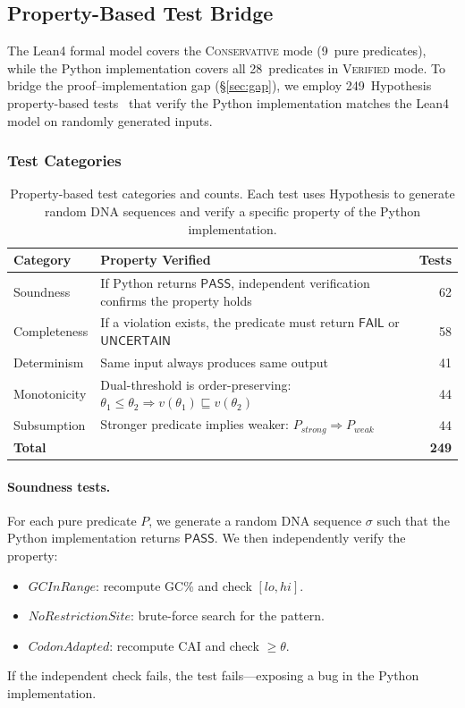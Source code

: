 \documentclass[sigplan,10pt,manuscript,review,anonymous]{acmart}
\newcommand{\PASS}{\ensuremath{\mathsf{PASS}}\xspace}
\newcommand{\FAIL}{\ensuremath{\mathsf{FAIL}}\xspace}
\newcommand{\UNCERTAIN}{\ensuremath{\mathsf{UNCERTAIN}}\xspace}
\newcommand{\seq}{\sigma}
\newcommand{\pred}{P}
\newcommand{\verdict}{v}
\newcommand{\CONSERVATIVE}{\textsc{Conservative}\xspace}
\newcommand{\VERIFIED}{\textsc{Verified}\xspace}
\begin{document}
\subsection{Property-Based Test Bridge}\label{sec:pbt}

The Lean4 formal model covers the \CONSERVATIVE{} mode (9~pure
predicates), while the Python implementation covers all 28~predicates
in \VERIFIED{} mode.
To bridge the proof--implementation gap (\S\ref{sec:gap}), we employ
249~Hypothesis property-based tests~\cite{maciver2019hypothesis}
that verify the Python implementation matches the Lean4 model on
randomly generated inputs.

\subsubsection{Test Categories}

\begin{table}[t]
\centering
\caption{Property-based test categories and counts. Each test uses
         Hypothesis to generate random DNA sequences and verify a
         specific property of the Python implementation.}
\label{tab:pbt}
\begin{tabular}{lp{6.5cm}r}
\toprule
\textbf{Category} & \textbf{Property Verified} & \textbf{Tests} \\
\midrule
Soundness &
  If Python returns \PASS{}, independent verification confirms
  the property holds & 62 \\
Completeness &
  If a violation exists, the predicate must return \FAIL{} or
  \UNCERTAIN{} & 58 \\
Determinism &
  Same input always produces same output & 41 \\
Monotonicity &
  Dual-threshold is order-preserving:
  $\theta_1 \le \theta_2 \Rightarrow
   \verdict(\theta_1) \sqsubseteq \verdict(\theta_2)$ & 44 \\
Subsumption &
  Stronger predicate implies weaker:
  $\pred_{\mathit{strong}} \Rightarrow \pred_{\mathit{weak}}$
  & 44 \\
\midrule
\textbf{Total} & & \textbf{249} \\
\bottomrule
\end{tabular}
\end{table}

\paragraph{Soundness tests.}
For each pure predicate $\pred$, we generate a random DNA sequence
$\seq$ such that the Python implementation returns \PASS.
We then independently verify the property:
\begin{itemize}[leftmargin=*,itemsep=0pt,topsep=1pt]
\item $\mathit{GCInRange}$: recompute GC\% and check $[lo, hi]$.
\item $\mathit{NoRestrictionSite}$: brute-force search for the
      pattern.
\item $\mathit{CodonAdapted}$: recompute CAI and check $\ge \theta$.
\end{itemize}
If the independent check fails, the test fails---exposing a bug in the
Python implementation.
\end{document}
